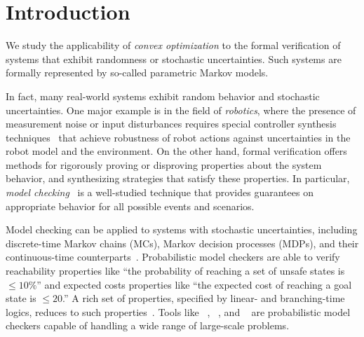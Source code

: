 \section{Introduction}
\label{sec:introduction}
%
We study the applicability of \emph{convex optimization} to the formal verification of systems that exhibit randomness or stochastic uncertainties. Such systems are formally represented by so-called parametric Markov models. 

In fact, many real-world systems exhibit random behavior and stochastic uncertainties. One major example is in the field of \emph{robotics}, where the presence of measurement noise or input disturbances requires special controller synthesis techniques~\cite{thrun2005probabilistic} that achieve robustness of robot actions against uncertainties in the robot model and the environment.
On the other hand, formal verification offers methods for rigorously proving or disproving properties about the system behavior, and synthesizing strategies that satisfy these properties.
In particular, \emph{model checking}~\cite{BK08} is a well-studied technique that provides guarantees on appropriate behavior for all possible events and scenarios.

Model checking can be applied to systems with stochastic uncertainties, including discrete-time Markov chains (MCs), Markov decision processes (MDPs), and their continuous-time counterparts~\cite{katoen2016probabilistic}.
Probabilistic model checkers are able to verify reachability properties like ``the probability of reaching a set of unsafe states is $\leq 10\%$'' and expected costs properties like ``the expected cost of reaching a goal state is $\leq 20$.''
A rich set of properties, specified by linear- and branching-time logics, reduces to such properties~\cite{katoen2016probabilistic}.
Tools like ~\cite{KNP11}, ~\cite{DBLP:journals/corr/DehnertJK016}, and 
~\cite{iscasmc} are probabilistic model checkers capable of handling a wide range of large-scale problems.

